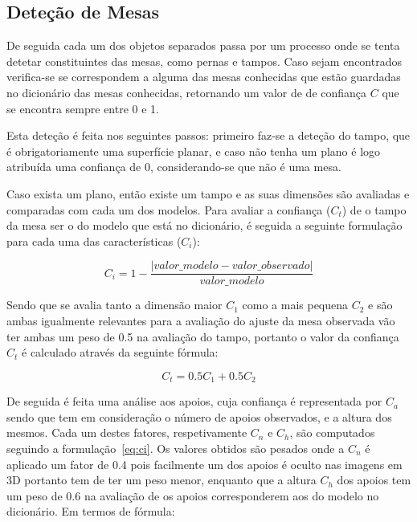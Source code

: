 \subsection{Deteção de Mesas}

De seguida cada um dos objetos separados passa por um processo onde se tenta 
detetar constituintes das mesas, como pernas e tampos. Caso sejam encontrados 
verifica-se se correspondem a alguma das mesas conhecidas que estão guardadas
no dicionário das mesas conhecidas, retornando um valor de de confiança \(C\) que se encontra sempre entre 0 e 1.

Esta deteção é feita nos seguintes passos: primeiro faz-se a deteção do tampo, que é obrigatoriamente uma superfície planar, e caso não tenha um plano é logo atribuída uma confiança de 0, considerando-se que não é uma mesa.

Caso exista um plano, então existe um tampo e as suas dimensões são avaliadas e comparadas com cada um dos modelos. Para avaliar a confiança (\(C_t\)) de o tampo da mesa ser o do modelo que está no dicionário, é seguida a seguinte formulação para cada uma das características (\(C_i\)):

\begin{equation}\label{eq:ci}
C_i = 1 - \frac{|valor\_modelo - valor\_observado|}{valor\_modelo}
\end{equation}

Sendo que se avalia tanto a dimensão maior \(C_1\) como a mais pequena  \(C_2\) e são ambas igualmente relevantes para a avaliação do ajuste da mesa observada vão ter ambas um peso de 0.5 na avaliação do tampo, portanto o valor da confiança \(C_t\) é calculado através da seguinte fórmula:

\begin{equation}\label{eq:ct}
C_t = 0.5C_1 + 0.5C_2
\end{equation}

De seguida é feita uma análise aos apoios, cuja confiança é representada por \(C_a\) sendo que tem em consideração o número de apoios observados, e a altura dos mesmos. Cada um destes fatores, respetivamente \(C_n\) e \(C_h\), são computados seguindo a formulação~\ref{eq:ci}. Os valores obtidos são pesados onde a \(C_n\) é aplicado um fator de 0.4 pois facilmente um dos apoios é oculto nas imagens em 3D portanto tem de ter um peso menor, enquanto que a altura \(C_h\) dos apoios tem um peso de 0.6 na avaliação de os apoios corresponderem aos do modelo no dicionário. Em termos de fórmula:

